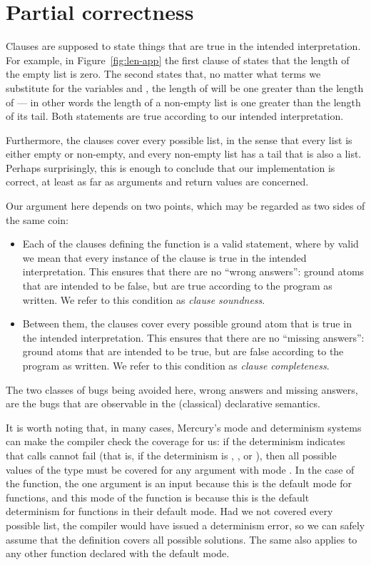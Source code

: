 \section{Partial correctness}
\label{sec:partial-correctness}

Clauses are supposed to state things that are
true in the intended interpretation.
For example,
in Figure~\ref{fig:len-app}
the first clause of  states that
the length of the empty list is zero.
The second states that,
no matter what terms we substitute
for the variables \co{\_} and ,
the length of \co{[\_~|~Xs]} will be one greater than
the length of ---%
in other words the length of a non-empty list
is one greater than the length of its tail.
Both statements are true
according to our intended interpretation.

Furthermore,
the clauses cover every possible list,
in the sense that every list is either empty or non-empty,
and every non-empty list has a tail that is also a list.
Perhaps surprisingly,
this is enough to conclude that our implementation is correct,
at least as far as arguments and return values are concerned.

Our argument here depends on two points,
which may be regarded as two sides of the same coin:
\begin{itemize}
\item
Each of the clauses defining the function is a valid statement,
where by valid we mean that every instance of the clause
is true in the intended interpretation.
This ensures that there are no ``wrong answers\label{gi:wrong-answer}'':
ground atoms that are intended to be false,
but are true according to the program as written.
We refer to this condition as
\emph{clause soundness\label{gi:clause-soundness}}.
\item
Between them,
the clauses cover every possible ground atom
that is true in the intended interpretation.
This ensures that there are no ``missing answers\label{gi:missing-answer}'':
ground atoms that are intended to be true,
but are false according to the program as written.
We refer to this condition as
\emph{clause completeness\label{gi:clause-completeness}}.
\end{itemize}
The two classes of bugs being avoided here,
wrong answers and missing answers,
are the bugs that are observable in
the (classical) declarative semantics.

It is worth noting that, in many cases,
Mercury's mode and determinism systems can
make the compiler check the coverage for us:
if the determinism indicates that calls cannot fail
(that is, if the determinism is
, , or ),
then all possible values of the type must be covered
for any argument with mode .
In the case of the  function,
the one argument is an input
because this is the default mode for functions,
and this mode of the function is 
because this is the default determinism
for functions in their default mode.
Had we not covered every possible list,
the compiler would have issued a determinism error,
so we can safely assume that
the definition covers all possible solutions.
The same also applies to any other function declared with
the default mode.

